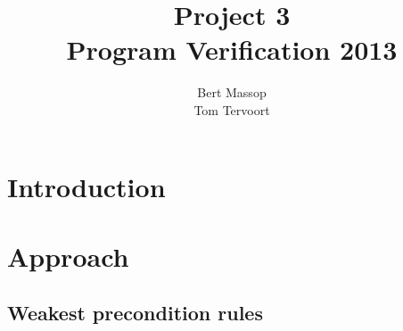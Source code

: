 \documentclass[a4paper]{article}
\title{Project 3\\\large\sc Program Verification 2013}
\author{Bert Massop\\Tom Tervoort}
\begin{document}
\maketitle

\section{Introduction}

\section{Approach}

\subsection{Weakest precondition rules}

\newcommand{\Q}{\mathcal{Q}}
\newcommand{\A}{\mathcal{A}}
\newcommand{\B}{\mathcal{B}}
\renewcommand{\wp}{\mathbf{wp}}
\newcommand{\stack}[1]{\mathcal{S}_{#1}}
\end{document}
